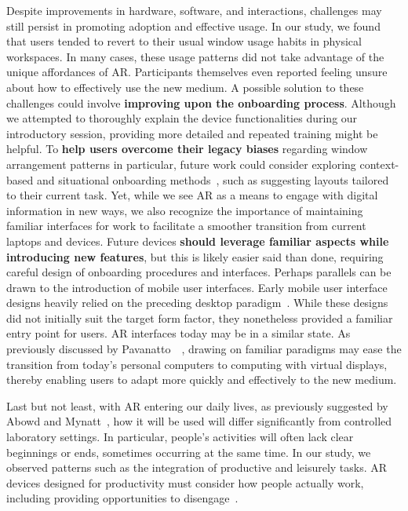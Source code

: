 Despite improvements in hardware, software, and interactions, challenges may still persist in promoting adoption and effective usage. 
In our study, we found that users tended to revert to their usual window usage habits in physical workspaces.
In many cases, these usage patterns did not take advantage of the unique affordances of AR. 
Participants themselves even reported feeling unsure about how to effectively use the new medium.
A possible solution to these challenges could involve \textbf{improving upon the onboarding process}. Although we attempted to thoroughly explain the device functionalities during our introductory session, providing more detailed and repeated training might be helpful.
To \textbf{help users overcome their legacy biases} regarding window arrangement patterns in particular, future work could consider exploring context-based and situational onboarding methods~\cite{chauvergne2023onboarding}, such as suggesting layouts tailored to their current task.
Yet, while we see AR as a means to engage with digital information in new ways, 
we also recognize the importance of maintaining familiar interfaces for work to facilitate a smoother transition from current laptops and devices.
Future devices \textbf{should leverage familiar aspects while introducing new features}, but this is likely easier said than done, requiring careful design of onboarding procedures and interfaces.
Perhaps parallels can be drawn to the introduction of mobile user interfaces. 
Early mobile user interface designs heavily relied on the preceding desktop paradigm~\cite{punchoojit2017mobileui}. While these designs did not initially suit the target form factor, 
they nonetheless provided a familiar entry point for users.
AR interfaces today may be in a similar state.
As previously discussed by Pavanatto~\etal~\cite{pavanatto2024multiplemonitors}, 
drawing on familiar paradigms may ease the transition from today's personal computers to computing with virtual displays, thereby enabling users to adapt more quickly and effectively to the new medium.

Last but not least, 
with AR entering our daily lives, 
as previously suggested by Abowd and Mynatt~\cite{abowd2000chartingubicomp},
how it will be used will differ significantly from controlled laboratory settings. 
In particular, people's activities will often lack clear beginnings or ends, sometimes occurring at the same time.
In our study, we observed patterns such as the integration of productive and leisurely tasks. AR devices designed for productivity must consider how people actually work, including providing opportunities to disengage~\cite{kaur2020breaks}.

